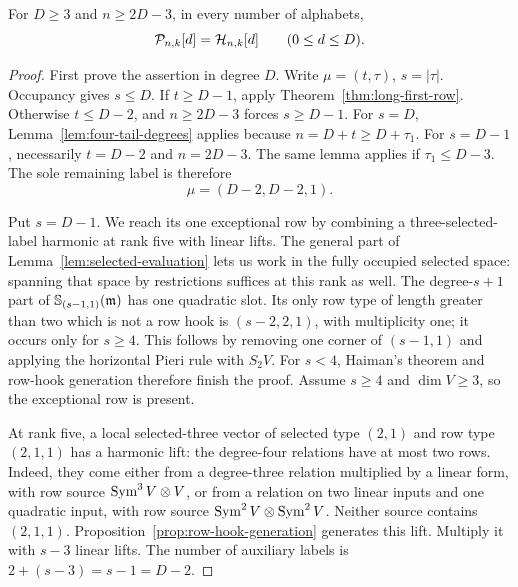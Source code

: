 \begin{theorem}
\label{thm:linear-generation}
For $D\ge3$ and $n\ge2D-3$, in every number of alphabets,
\[
 \mathcal P_{n,k}[d]=\mathcal H_{n,k}[d]\qquad(0\le d\le D).
\]
\end{theorem}
\begin{proof}
First prove the assertion in degree $D$.
Write $\mu=(t,\tau)$, $s=|\tau|$. Occupancy gives $s\le D$.
If $t\ge D-1$, apply Theorem~\ref{thm:long-first-row}.
Otherwise $t\le D-2$, and $n\ge2D-3$ forces $s\ge D-1$.
For $s=D$, Lemma~\ref{lem:four-tail-degrees} applies because
$n=D+t\ge D+\tau_1$.  For $s=D-1$, necessarily
$t=D-2$ and $n=2D-3$.  The same lemma applies if
$\tau_1\le D-3$.  The sole remaining label is therefore
\[
                         \mu=(D-2,D-2,1).
\]

Put $s=D-1$.  We reach its one exceptional row by combining a
three-selected-label harmonic at rank five with linear lifts.
The general part of Lemma~\ref{lem:selected-evaluation} lets us
work in the fully occupied selected space: spanning that space
by restrictions suffices at this rank as well.
The degree-$s+1$ part of $\mathbb S_{(s-1,1)}(\mathfrak m)$ has one
quadratic slot. Its only row type of length greater than two which
is not a row hook is $(s-2,2,1)$, with multiplicity one; it occurs
only for $s\ge4$. This follows by removing one corner of $(s-1,1)$
and applying the horizontal Pieri rule with $S_2V$.
For $s<4$, Haiman's theorem and row-hook generation therefore
finish the proof.  Assume $s\ge4$ and $\dim V\ge3$, so the
exceptional row is present.

At rank five, a local selected-three vector of selected type
$(2,1)$ and row type $(2,1,1)$ has a harmonic lift: the degree-four
relations have at most two rows.  Indeed, they come either from
a degree-three relation multiplied by a linear form, with row
source $\operatorname{Sym}^3V\otimes V$, or from a relation on two linear
inputs and one quadratic input, with row source
$\operatorname{Sym}^2V\otimes\operatorname{Sym}^2V$.  Neither source contains $(2,1,1)$.
Proposition~\ref{prop:row-hook-generation} generates this lift.
Multiply it with $s-3$ linear lifts. The number of auxiliary labels is
$2+(s-3)=s-1=D-2$.


\end{proof}
